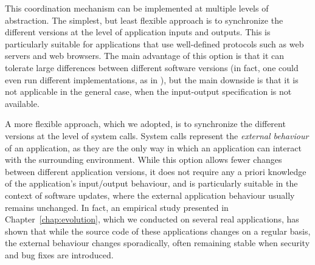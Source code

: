 This coordination mechanism can be implemented at multiple levels of
abstraction. The simplest, but least flexible approach is to synchronize the
different versions at the level of application inputs and outputs. This is
particularly suitable for applications that use well-defined protocols such as
web servers and web browsers. The main advantage of this option is that it can
tolerate large differences between different software versions (in fact, one
could even run different implementations, as in \cite{cocktail}), but the main
downside is that it is not applicable in the general case, when the
input-output specification is not available.

A more flexible approach, which we adopted, is to synchronize the different
versions at the level of system calls.  System calls represent the
\emph{external behaviour} of an application, as they are the only way in which
an application can interact with the surrounding environment.  While this
option allows fewer changes between different application versions, it does not
require any a priori knowledge of the application's input/output behaviour, and
is particularly suitable in the context of software updates, where the external
application behaviour usually remains unchanged.  In fact, an empirical study
presented in Chapter~\ref{chap:evolution}, which we conducted on several real
applications, has shown that while the source code of these applications
changes on a regular basis, the external behaviour changes sporadically, often
remaining stable when security and bug fixes are introduced.





